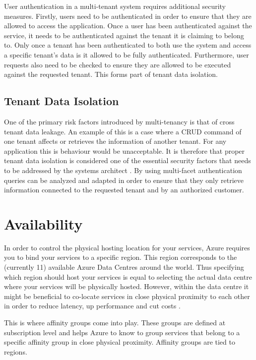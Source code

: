User authentication in a multi-tenant system requires additional security measures. Firstly, users need to be authenticated in order to ensure that they are allowed to access the application. Once a user has been authenticated against the service, it needs to be authenticated against the tenant it is claiming to belong to. Only once a tenant has been authenticated to both use the system and access a specific tenant's data is it allowed to be fully authenticated. Furthermore, user requests also need to be checked to ensure they are allowed to be executed against the requested tenant. This forms part of tenant data isolation.


\subsection{Tenant Data Isolation}

One of the primary risk factors introduced by multi-tenancy is that of cross tenant data leakage. An example of this is a case where a CRUD command of one tenant affects or retrieves the information of another tenant. For any application this is behaviour would be unacceptable. It is therefore that proper tenant data isolation is considered one of the essential security factors that needs to be addressed by the systems architect \cite{Wilder2012-so}. By using multi-facet authentication queries can be analyzed and adapted in order to ensure that they only retrieve information connected to the requested tenant and by an authorized customer.


\section{Availability}

In order to control the physical hosting location for your services, Azure requires you to bind your services to a specific region. This region corresponds to the (currently 11) available Azure Data Centres around the world\cite{Microsoft_Corporation2014-bf}. Thus specifying which region should host your services is equal to selecting the actual data centre where your services will be physically hosted. However, within the data centre it might be beneficial to co-locate services in close physical proximity to each other in order to reduce latency, up performance and cut costs \cite{Microsoft_Corporation2014-dn}.
 
This is where affinity groups come into play. These groups are defined at subscription level and helps Azure to know to group services that belong to a specific affinity group in close physical proximity. Affinity groups are tied to regions.
 
